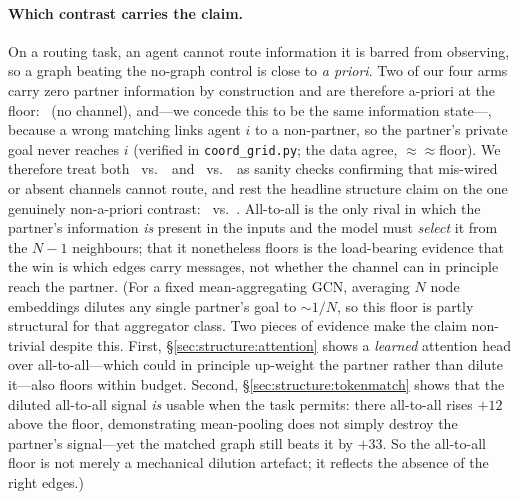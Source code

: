 \paragraph{Which contrast carries the claim.}
On a routing task, an agent cannot route information it is barred from
observing, so a graph beating the no-graph control is close to \emph{a
priori}. Two of our four arms carry zero partner information by
construction and are therefore a-priori at the floor: \mlpc\ (no channel),
and---we concede this to be the same information state---\gwrong, because a
wrong matching links agent $i$ to a non-partner, so the partner's private
goal never reaches $i$ (verified in \texttt{coord\_grid.py}; the data agree,
\gwrong${\approx}$\mlpc${\approx}$floor). We therefore treat both \gtrue\
vs.\ \mlpc\ and \gtrue\ vs.\ \gwrong\ as sanity checks confirming that
mis-wired or absent channels cannot route, and rest the headline structure
claim on the one genuinely non-a-priori contrast: \gtrue\ vs.\ \gcomplete.
All-to-all is the only rival in which the partner's information \emph{is}
present in the inputs and the model must \emph{select} it from the $N{-}1$
neighbours; that it nonetheless floors is the load-bearing evidence that the
win is which edges carry messages, not whether the channel can in principle
reach the partner. (For a fixed mean-aggregating GCN, averaging $N$ node
embeddings dilutes any single partner's goal to ${\sim}1/N$, so this
floor is partly structural for that aggregator class. Two pieces of evidence
make the claim non-trivial despite this. First, \S\ref{sec:structure:attention}
shows a \emph{learned} attention head over all-to-all---which could in
principle up-weight the partner rather than dilute it---also floors within
budget. Second, \S\ref{sec:structure:tokenmatch} shows that the diluted
all-to-all signal \emph{is} usable when the task permits: there all-to-all rises
$+12$ above the floor, demonstrating mean-pooling does not simply destroy the
partner's signal---yet the matched graph still beats it by $+33$. So the
all-to-all floor is not merely a mechanical dilution artefact; it reflects the
absence of the right edges.)

